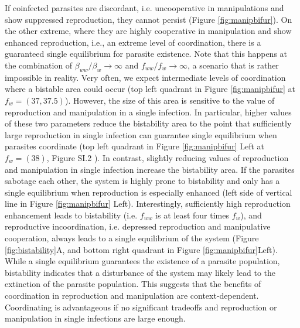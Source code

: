 \documentclass[a4paper]{scrartcl}
\begin{document}
If coinfected parasites are discordant, i.e. uncooperative in manipulations and show suppressed reproduction, they cannot persist (Figure \ref{fig:manipbifur}). 
On the other extreme, where they are highly cooperative in manipulation and show enhanced reproduction, i.e., an extreme level of coordination, there is a guaranteed single equilibrium for parasite existence. 
Note that this happens at the combination of $\beta_{ww}/\beta_w \rightarrow \infty$ and $f_{ww}/f_w \rightarrow \infty$, a scenario that is rather impossible in reality. 
Very often, we expect intermediate levels of coordination where a bistable area could occur (top left quadrant in Figure \ref{fig:manipbifur} at $f_w = (37, 37.5)$).
However, the size of this area is sensitive to the value of reproduction and manipulation in a single infection. 
In particular, higher values of these two parameters reduce the bistability area to the point that sufficiently large reproduction in single infection can guarantee single equilibrium when parasites coordinate (top left quadrant in Figure \ref{fig:manipbifur} Left at $f_w = (38)$, Figure SI.2 ).
In contrast, slightly reducing values of reproduction and manipulation in single infection increase the bistability area.
If the parasites sabotage each other, the system is highly prone to bistability and only has a single equilibrium when reproduction is especially enhanced (left side of vertical line in Figure \ref{fig:manipbifur} Left).
Interestingly, sufficiently high reproduction enhancement leads to bistability (i.e. $f_{ww}$ is at least four times $f_w$), and reproductive incoordination, i.e. depressed reproduction and manipulative cooperation, always leads to a single equilibrium of the system (Figure \ref{fig:bistability}A, and bottom right quadrant in Figure \ref{fig:manipbifur}Left). 
While a single equilibrium guarantees the existence of a parasite population, bistability indicates that a disturbance of the system may likely lead to the extinction of the parasite population. 
This suggests that the benefits of coordination in reproduction and manipulation are context-dependent. 
Coordinating is advantageous if no significant tradeoffs and reproduction or manipulation in single infections are large enough. 
\end{document}
